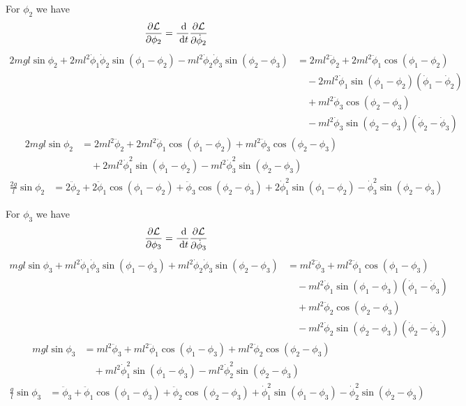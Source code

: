 \documentclass{article}
\renewcommand{\L}{\mathcal{L}}
\begin{document}
\begin{appendices}
    For $\phi_2$ we have
    \begin{align}
        \pD{\L}{\phi_2} &= \D{}{t}\pD{\L}{\dot\phi_2} 
    \end{align}
    \begin{align}
        2mgl\sin\phi_2 +2ml^2\dot\phi_1\dot\phi_2\sin(\phi_1-\phi_2)
            -ml^2\dot\phi_2\dot\phi_3\sin(\phi_2-\phi_3)
        &= 2ml^2\ddot\phi_2 + 2ml^2\ddot\phi_1\cos(\phi_1-\phi_2) \\
        &\quad - 2ml^2\dot\phi_1\sin(\phi_1-\phi_2)(\dot\phi_1-\dot\phi_2) \\
        &\quad + ml^2\ddot\phi_3\cos(\phi_2-\phi_3) \\
        &\quad - ml^2\dot\phi_3\sin(\phi_2-\phi_3)(\dot\phi_2-\dot\phi_3) 
    \end{align}
    \begin{align}
        2mgl\sin\phi_2 &= 2ml^2\ddot\phi_2 + 2ml^2\ddot\phi_1\cos(\phi_1-\phi_2)
            + ml^2\ddot\phi_3\cos(\phi_2-\phi_3)  \\
            &\quad + 2ml^2\dot\phi_1^2\sin(\phi_1-\phi_2)
            - ml^2\dot\phi_3^2\sin(\phi_2-\phi_3)
    \end{align}
    \begin{align}
        \frac{2g}{l}\sin\phi_2 &= 2\ddot\phi_2 + 2\ddot\phi_1\cos(\phi_1-\phi_2)
            + \ddot\phi_3\cos(\phi_2-\phi_3) + 2\dot\phi_1^2\sin(\phi_1-\phi_2)
            - \dot\phi_3^2\sin(\phi_2-\phi_3)   \label{eq_m2}
    \end{align}

    For $\phi_3$ we have
    \begin{align}
        \pD{\L}{\phi_3} &= \D{}{t}\pD{\L}{\dot\phi_3} 
    \end{align}
    \begin{align}
        mgl\sin\phi_3 +ml^2\dot\phi_1\dot\phi_3\sin(\phi_1-\phi_3)
            +ml^2\dot\phi_2\dot\phi_3\sin(\phi_2-\phi_3)
        &= ml^2\ddot\phi_3 + ml^2\ddot\phi_1\cos(\phi_1-\phi_3) \\
        &\quad - ml^2\dot\phi_1\sin(\phi_1-\phi_3)(\dot\phi_1-\dot\phi_3) \\
        &\quad + ml^2\ddot\phi_2\cos(\phi_2-\phi_3) \\
        &\quad - ml^2\dot\phi_2\sin(\phi_2-\phi_3)(\dot\phi_2-\dot\phi_3) 
    \end{align}
    \begin{align}
        mgl\sin\phi_3 &= ml^2\ddot\phi_3 + ml^2\ddot\phi_1\cos(\phi_1-\phi_3)
            + ml^2\ddot\phi_2\cos(\phi_2-\phi_3)  \\
            &\quad + ml^2\dot\phi_1^2\sin(\phi_1-\phi_3)
            - ml^2\dot\phi_2^2\sin(\phi_2-\phi_3)
    \end{align}
    \begin{align}
        \frac{g}{l}\sin\phi_3 &= \ddot\phi_3 + \ddot\phi_1\cos(\phi_1-\phi_3)
            + \ddot\phi_2\cos(\phi_2-\phi_3) + \dot\phi_1^2\sin(\phi_1-\phi_3)
            - \dot\phi_2^2\sin(\phi_2-\phi_3)   \label{eq_m3}
    \end{align}



\end{appendices}
\end{document}
